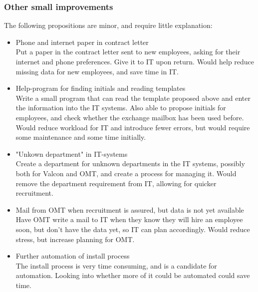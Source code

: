 \subsubsection{Other small improvements}
The following propositions are minor, and require little explanation:
\begin{itemize}
	\item Phone and internet paper in contract letter\\
	
			Put a paper in the contract letter sent to new employees, asking for their internet and phone preferences. Give it to IT upon return. Would help reduce missing data for new employees, and save time in IT.

	\item Help-program for finding initials and reading templates\\
	
			Write a small program that can read the template proposed above and enter the information into the IT systems.
			Also able to propose initials for employees, and check whether the exchange mailbox has been used before.
			Would reduce workload for IT and introduce fewer errors, but would require some maintenance and some time initially.
	
	\item "Unkown department" in IT-systems\\
	
			Create a department for unknown departments in the IT systems, possibly both for Valcon and OMT, and create a process for managing it.
			Would remove the department requirement from IT, allowing for quicker recruitment.
			
	\item Mail from OMT when recruitment is assured, but data is not yet available\\
	
			Have OMT write a mail to IT when they know they will hire an employee soon, but don't have the data yet, so IT can plan accordingly.
			Would reduce stress, but increase planning for OMT.
			
	\item Further automation of install process\\
	
			The install process is very time consuming, and is a candidate for automation.
			Looking into whether more of it could be automated could save time.
\end{itemize}

